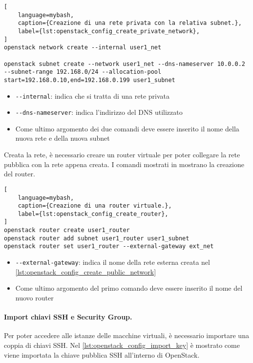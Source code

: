 \begin{lstlisting}[
    language=mybash, 
    caption={Creazione di una rete privata con la relativa subnet.},
    label={lst:openstack_config_create_private_network},
]
openstack network create --internal user1_net

openstack subnet create --network user1_net --dns-nameserver 10.0.0.2 --subnet-range 192.168.0/24 --allocation-pool start=192.168.0.10,end=192.168.0.199 user1_subnet
\end{lstlisting}

\begin{itemize}
    \item \verb|--internal|: indica che si tratta di una rete privata
    
    \item \verb|--dns-nameserver|: indica l'indirizzo del DNS utilizzato
    
    \item Come ultimo argomento dei due comandi deve essere inserito il nome della nuova rete e della nuova subnet
\end{itemize}

\noindent
Creata la rete, è necessario creare un router virtuale per poter collegare la rete pubblica con la rete appena creata.
% 
I comandi mostrati in  mostrano la creazione del router.
\begin{lstlisting}[
    language=mybash, 
    caption={Creazione di una router virtuale.},
    label={lst:openstack_config_create_router},
]
openstack router create user1_router
openstack router add subnet user1_router user1_subnet
openstack router set user1_router --external-gateway ext_net
\end{lstlisting}
\begin{itemize}
    \item \verb|--external-gateway|: indica il nome della rete esterna creata nel \cref{lst:openstack_config_create_public_network}
    
    \item Come ultimo argomento del primo comando deve essere inserito il nome del nuovo router
\end{itemize}



\paragraph{Import chiavi SSH e Security Group.}
Per poter accedere alle istanze delle macchine virtuali, è necessario importare una coppia di chiavi SSH.
% 
Nel \cref{lst:openstack_config_import_key} è mostrato come viene importata la chiave pubblica SSH all'interno di OpenStack.

